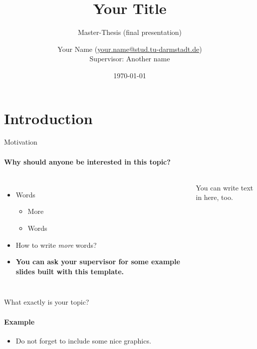 \documentclass[
	english,%
	aspectratio=169,%
	accentcolor=1b,
	logo=true,%
	colorframetitle=true,%
	authorontitle=true,
	usepdftitle=false,
	design=2008,
	]{tudabeamer}
\title{Your Title}
\subtitle{Master-Thesis (final presentation)}
\author[Your Name]{Your Name \normalfont(\href{mailto:your.name@stud.tu-darmstadt.de}{your.name@stud.tu-darmstadt.de})\\
Supervisor: Another name
}
\institute[]{Real-Time Systems Lab} %
\date{\today}
\begin{document}
\maketitle

%
%

\section{Introduction}

\begin{frame}{Motivation}
	\framesubtitle{Why should anyone be interested in this topic?}
	\label{motivation}
	
	\begin{columns}[onlytextwidth,c]
		\begin{itemize}
			\item Words
			\begin{itemize}
				\item More
				\item Words
			\end{itemize}
			\vspace{1em}
		
			\item How to write \textit{more} words?
			
			\item \textbf{You can ask your supervisor for some example slides built with this template.}
		\end{itemize}
	
		\vspace{-0.5em}
		You can write text in here, too.
	\end{columns}
\end{frame}

\begin{frame}{What exactly is your topic?}
	\framesubtitle{Example}
	\label{what-is-this}
	
	\begin{itemize}
		\item Do not forget to include some nice graphics.
	\end{itemize}
\end{frame}
\end{document}
